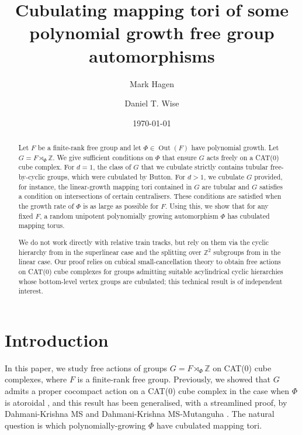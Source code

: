 \documentclass[11pt,oneside]{amsart}
\theoremstyle{definition}
\DeclareMathOperator{\Out}{Out}
\newcommand{\field}[1]{\mathbb{#1}}
\newcommand{\integers}{\ensuremath{\field{Z}}}
\begin{document}
\title[Cubulating polynomial mapping tori]{Cubulating 
mapping tori of some polynomial growth free group automorphisms}

\author[M.~Hagen]{Mark Hagen}
\address{School of Mathematics, University of Bristol, Bristol, UK}


\author[D.T.~Wise]{Daniel T. Wise}
\address{Department of Mathematics, Weizmann Institute of Science, Rehovot, Israel}


\date{\today}

\maketitle

\begin{abstract}
 Let $F$ be a finite-rank free group and let $\Phi\in\Out(F)$ have polynomial growth.  Let $G=F\rtimes_\Phi\integers$.  We give sufficient conditions on $\Phi$ that ensure $G$ acts freely on a CAT(0) cube complex.  For $d=1$, the class of $G$ that we cubulate strictly contains tubular free-by-cyclic groups, which were cubulated by Button.  For $d>1$, we cubulate $G$ provided, for instance, the linear-growth mapping tori contained in $G$ are tubular and $G$ satisfies a condition on intersections of certain centralisers.  These conditions are satisfied when the growth rate of $\Phi$ is as large as possible for $F$.  Using this, we show that for any fixed $F$, a random unipotent polynomially growing automorphism $\Phi$ has cubulated mapping torus.

 We do not work directly with relative train tracks, but rely on them via the cyclic hierarchy from \cite{Macura:detour} in the superlinear case and the splitting over $\integers^2$ subgroups from \cite{AndrewMartino:splitting,DahmaniTouikan} in the linear case.  Our proof relies on cubical small-cancellation theory to obtain free actions on CAT(0) cube complexes for groups admitting suitable acylindrical cyclic hierarchies whose bottom-level vertex groups are cubulated; this technical result is of independent interest. 
\end{abstract}



\tableofcontents

\section{Introduction}\label{sec:intro}
In this paper, we study free actions of groups $G=F\rtimes_\Phi\integers$ on CAT(0) cube complexes, where $F$ is a finite-rank free group.  Previously, we showed that $G$ admits a proper cocompact action on a CAT(0) cube complex in the case when $\Phi$ is atoroidal \cite{HagenWise:irred,HagenWise:general}, and this result has been generalised, with a streamlined proof, by Dahmani-Krishna MS \cite{DahmaniKrishna:irred} and Dahmani-Krishna MS-Mutanguha \cite{DahmaniKrishnaMutanguha}.  The natural question is which polynomially-growing $\Phi$ have cubulated mapping tori.
\end{document}
